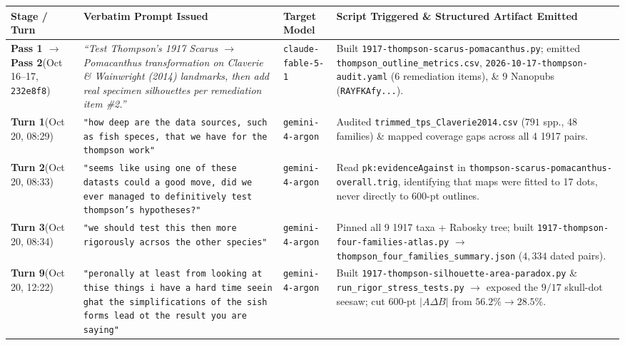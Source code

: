 \documentclass[10.5pt,a4paper]{article}
\newcommand{\code}[1]{{\footnotesize\nolinkurl{#1}}}
\begin{document}
\vspace{0.2em}
{\footnotesize
\renewcommand{\arraystretch}{1.20}
\begin{tabularx}{\textwidth}{L{1.15in} L{2.05in} L{0.85in} Y}
\toprule
\textbf{Stage / Turn} & \textbf{Verbatim Prompt Issued} & \textbf{Target Model} & \textbf{Script Triggered \& Structured Artifact Emitted} \\
\midrule
\textbf{Pass 1 $\to$ Pass 2}\newline (Oct 16--17, \texttt{232e8f8}) & \emph{``Test Thompson's 1917 Scarus $\to$ Pomacanthus transformation on Claverie \& Wainwright (2014) landmarks, then add real specimen silhouettes per remediation item \#2.''} & \code{claude-fable-5-1} & Built \code{1917-thompson-scarus-pomacanthus.py}; emitted \code{thompson_outline_metrics.csv}, \code{2026-10-17-thompson-audit.yaml} (6 remediation items), \& 9 Nanopubs (\code{RAYFKAfy...}). \\
\textbf{Turn 1}\newline (Oct 20, 08:29) & \texttt{"how deep are the data sources, such as fish speces, that we have for the thompson work"} & \code{gemini-4-argon} & Audited \code{trimmed_tps_Claverie2014.csv} ($791$ spp., 48 families) \& mapped coverage gaps across all 4 1917 pairs. \\
\textbf{Turn 2}\newline (Oct 20, 08:33) & \texttt{"seems like using one of these datasts could a good move, did we ever managed to definitively test thompson's hypotheses?"} & \code{gemini-4-argon} & Read \texttt{pk:evidenceAgainst} in \code{thompson-scarus-pomacanthus-overall.trig}, identifying that maps were fitted to 17 dots, never directly to 600-pt outlines. \\
\textbf{Turn 3}\newline (Oct 20, 08:34) & \texttt{"we should test this then more rigorously acrsos the other species"} & \code{gemini-4-argon} & Pinned all 9 1917 taxa + Rabosky tree; built \code{1917-thompson-four-families-atlas.py} $\to$ \code{thompson_four_families_summary.json} ($4{,}334$ dated pairs). \\
\textbf{Turn 9}\newline (Oct 20, 12:22) & \texttt{"peronally at least from looking at thise things i have a hard time seein ghat the simplifications of the sish forms lead ot the result you are saying"} & \code{gemini-4-argon} & Built \code{1917-thompson-silhouette-area-paradox.py} \& \code{run_rigor_stress_tests.py} $\to$ exposed the $9/17$ skull-dot seesaw; cut 600-pt $|A\Delta B|$ from $56.2\% \to 28.5\%$. \\

\end{tabularx}}
\end{document}
